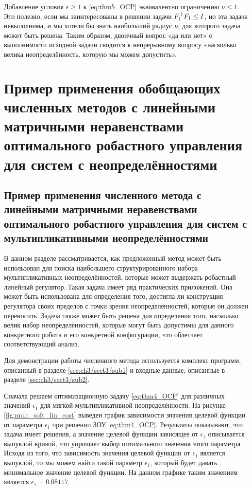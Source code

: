 \begin{remark}
	\label{rm:nu_trick}
	Добавление условия $\bar{\epsilon}\geq 1$ к \eqref{eq:thm5_OCP} эквивалентно ограничению $\nu \leq 1$. Это полезно, если мы заинтересованы в решении задачи ${F}_1^\top{F}_1 \leq {I}$, но эта задача невыполнима, и мы хотели бы знать наибольший радиус $\nu$, для которого задача может быть решена. Таким образом, двоичный вопрос «да или нет» о выполнимости исходной задачи сводится к непрерывному вопросу «насколько велика неопределённость, которую мы можем допустить».
\end{remark}

\section{Пример применения обобщающих численных методов с линейными матричными неравенствами оптимального робастного управления для систем с неопределённостями}\label{sec:ch4/sect3}

\subsection{Пример применения численного метода с линейными матричными неравенствами оптимального робастного управления для систем с мультипликативными неопределённостями}\label{sec:ch4/sect3/sub1}

В данном разделе рассматривается, как предложенный метод может быть использован для поиска наибольшего структурированного набора мультипликативных неопределённостей, которые может выдержать робастный линейный регулятор. Такая задача имеет ряд практических приложений. Она может быть использована для определения того, достигла ли конструкция регулятора своих пределов с точки зрения неопределённостей, которые он должен переносить. Задача также может быть решена для определения того, насколько велик набор неопределённостей, которые могут быть допустимы для данного конкретного робота и его конкретной конфигурации, что облегчает соответствующий анализ.

Для демонстрации работы численного метода используется комплекс программ, описанный в разделе \ref{sec:ch3/sect3/sub1} и входные данные, описанные в разделе \ref{sec:ch3/sect3/sub2}.

Сначала решаем оптимизационную задачу \eqref{eq:thm4_OCP} для различных значений $\epsilon_1$ для мягкой мультипликативной неопределённости. 
На рисунке \ref{fig:mult_soft_lin_cost} выведен график зависимости значения целевой функции от параметра $\epsilon_1$ при решении ЗОУ \eqref{eq:thm4_OCP}. Результаты показывают, что задача имеет решения, а значение целевой функции зависящее от $\epsilon_1$ описывается выпуклой кривой, что упрощает выбор оптимального значения этого параметра. Исходя из того, что зависимость значения целевой функции от $\epsilon_1$ является выпуклой, то мы можем найти такой параметр $\epsilon_1$, который будет давать минимальное значение целевой функции. На данном графике таким значением является $\epsilon_1 = 0.08117$.

